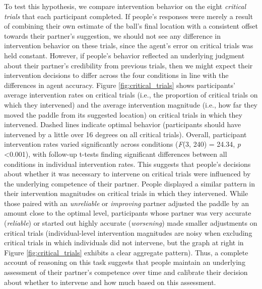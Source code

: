 \documentclass[10pt,letterpaper]{article}
\begin{document}
To test this hypothesis, we compare intervention behavior on the eight \textit{critical trials} that each participant completed. If people's responses were merely a result of combining their own estimate of the ball's final location with a consistent offset towards their partner's suggestion, we should not see any difference in intervention behavior on these trials, since the agent's error on critical trials was held constant. However, if people's behavior reflected an underlying judgment about their partner's credibility from previous trials, then we might expect their intervention decisions to differ across the four conditions in line with the differences in agent accuracy. Figure \ref{fig:critical_trials} shows participants' average intervention rates on critical trials (i.e., the proportion of critical trials on which they intervened) and the average intervention magnitude (i.e., how far they moved the paddle from its suggested location) on critical trials in which they intervened. Dashed lines indicate optimal behavior (participants should have intervened by a little over 16 degrees on all critical trials). Overall, participant intervention rates varied significantly across conditions (\textit{F}(3, 240) = 24.34, \textit{p} \textless{0.001}), with follow-up t-tests finding significant differences between all conditions in individual intervention rates. This suggests that people's decisions about whether it was necessary to intervene on critical trials were influenced by the underlying competence of their partner. People displayed a similar pattern in their intervention magnitudes on critical trials in which they intervened. While those paired with an \textit{unreliable} or \textit{improving} partner adjusted the paddle by an amount close to the optimal level, participants whose partner was very accurate (\textit{reliable}) or started out highly accurate (\textit{worsening}) made smaller adjustments on critical trials (individual-level intervention magnitudes are noisy when excluding critical trials in which individuals did not intervene, but the graph at right in Figure \ref{fig:critical_trials} exhibits a clear aggregate pattern). Thus, a complete account of  reasoning on this task suggests that people maintain an underlying assessment of their partner's competence over time and calibrate their decision about whether to intervene and how much based on this assessment.
\end{document}
